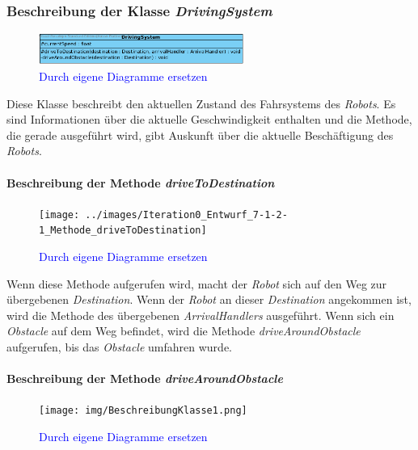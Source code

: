 	\subsubsection{Beschreibung der Klasse \textit{DrivingSystem}}
		\begin{figure}[H]
		\centering
		\includegraphics[width=0.6\textwidth]{../images/Iteration0_Entwurf_7-1-2_Klasse_DrivingSystem}
		\caption{\textcolor{blue}{Durch eigene Diagramme ersetzen}}
		\label{BeschreibungKlasse1}
		\end{figure}
		
		Diese Klasse beschreibt den aktuellen Zustand des Fahrsystems des \textit{Robots}. 
		Es sind Informationen über die aktuelle Geschwindigkeit enthalten und die Methode, 
		die gerade ausgeführt wird, gibt Auskunft über die aktuelle Beschäftigung des \textit{Robots}.

			\paragraph{Beschreibung der Methode \textit{driveToDestination}}
			\begin{figure}[H]
			\centering
			\texttt{[image: ../images/Iteration0\_Entwurf\_7-1-2-1\_Methode\_driveToDestination]}
			\caption{\textcolor{blue}{Durch eigene Diagramme ersetzen}}
			\label{BeschreibungKlasse1}
			\end{figure}

			Wenn diese Methode aufgerufen wird, macht der \textit{Robot} sich auf den Weg zur 
			übergebenen \textit{Destination}. Wenn der \textit{Robot} an dieser \textit{Destination} 
			angekommen ist, wird die Methode des übergebenen \textit{ArrivalHandlers} ausgeführt. 
			Wenn sich ein \textit{Obstacle} auf dem Weg befindet, wird die Methode \textit{driveAroundObstacle} 
			aufgerufen, bis das \textit{Obstacle} umfahren wurde.

			\paragraph{Beschreibung der Methode \textit{driveAroundObstacle}}
			\begin{figure}[H]
			\centering
			\texttt{[image: img/BeschreibungKlasse1.png]}
			\caption{\textcolor{blue}{Durch eigene Diagramme ersetzen}}
			\label{BeschreibungKlasse1}
			\end{figure}

